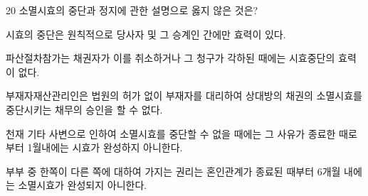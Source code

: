 \begin{question}{20}
소멸시효의 중단과 정지에 관한 설명으로 옳지 않은 것은?
\begin{choices}
  \item 시효의 중단은 원칙적으로 당사자 및 그 승계인 간에만 효력이 있다.
  \item 파산절차참가는 채권자가 이를 취소하거나 그 청구가 각하된 때에는 시효중단의 효력이 없다.
  \item 부재자재산관리인은 법원의 허가 없이 부재자를 대리하여 상대방의 채권의 소멸시효를 중단시키는 채무의 승인을 할 수 없다.
  \item 천재 기타 사변으로 인하여 소멸시효를 중단할 수 없을 때에는 그 사유가 종료한 때로부터 1월내에는 시효가 완성하지 아니한다.
  \item 부부 중 한쪽이 다른 쪽에 대하여 가지는 권리는 혼인관계가 종료된 때부터 6개월 내에는 소멸시효가 완성되지 아니한다.
\end{choices}
\end{question}
